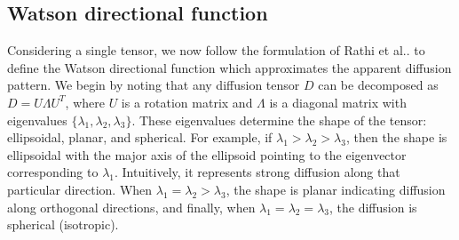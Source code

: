 \documentclass[final,hyperref]{gatech-thesis}
\makeatletter
\DeclareRobustCommand\onedot{\futurelet\@let@token\@onedot}
\def\@onedot{\ifx\@let@token.\else.\null\fi\xspace}
\newcommand{\etal}{et al\onedot}
\makeatother
\begin{document}
\subsection{Watson directional function} \label{sec:watson}

Considering a single tensor, we now follow the formulation of Rathi
\etal\cite{Rathi2009mia_w} to define the Watson directional function which
approximates the apparent diffusion pattern.  We begin by noting that any
diffusion tensor $D$ can be decomposed as $D = U \Lambda U^T$, where $U$ is a
rotation matrix and $\Lambda$ is a diagonal matrix with eigenvalues
$\{\lambda_1, \lambda_2, \lambda_3\}$.  These eigenvalues determine the shape
of the tensor:  ellipsoidal, planar, and spherical.  For example, if
$\lambda_1 > \lambda_2 > \lambda_3$, then the shape is ellipsoidal with the
major axis of the ellipsoid pointing to the eigenvector corresponding to
$\lambda_1$.  Intuitively, it represents strong diffusion along that
particular direction.  When $\lambda_1 = \lambda_2 > \lambda_3$, the shape is
planar indicating diffusion along orthogonal directions, and finally, when
$\lambda_1 = \lambda_2 = \lambda_3$, the diffusion is spherical (isotropic).
\end{document}
